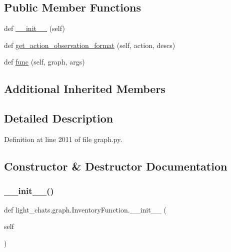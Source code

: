 \subsection*{Public Member Functions}
\begin{DoxyCompactItemize}
\item 
def \hyperlink{classlight__chats_1_1graph_1_1InventoryFunction_a4fa076967af0f8541f53e92721777f27}{\+\_\+\+\_\+init\+\_\+\+\_\+} (self)
\item 
def \hyperlink{classlight__chats_1_1graph_1_1InventoryFunction_a9527cd8b211efa8aafc21b2a40b14760}{get\+\_\+action\+\_\+observation\+\_\+format} (self, action, descs)
\item 
def \hyperlink{classlight__chats_1_1graph_1_1InventoryFunction_ae1d63ccf80bca5e20060ca5ffb8a684a}{func} (self, graph, args)
\end{DoxyCompactItemize}
\subsection*{Additional Inherited Members}


\subsection{Detailed Description}


Definition at line 2011 of file graph.\+py.



\subsection{Constructor \& Destructor Documentation}
\mbox{\label{classlight__chats_1_1graph_1_1InventoryFunction_a4fa076967af0f8541f53e92721777f27}} 
\subsubsection{\texorpdfstring{\+\_\+\+\_\+init\+\_\+\+\_\+()}{\_\_init\_\_()}}
{\footnotesize\ttfamily def light\+\_\+chats.\+graph.\+Inventory\+Function.\+\_\+\+\_\+init\+\_\+\+\_\+ (\begin{DoxyParamCaption}\item[{}]{self }\end{DoxyParamCaption})}



